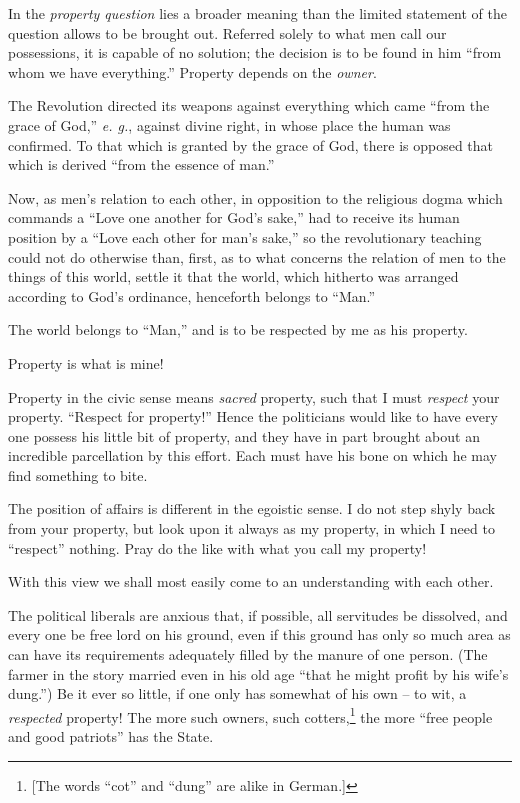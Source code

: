 \documentclass[12pt,a4paper]{book}
\begin{document}
In the \textit{property question} lies a broader meaning than the limited 
statement of the question allows to be brought out. Referred solely to what 
men call our possessions, it is capable of no solution; the decision is to be 
found in him ``from whom we have everything.'' Property depends on the 
\textit{owner}.

The Revolution directed its weapons against everything which came ``from the 
grace of God,'' \textit{e. g.}, against divine right, in whose place the 
human was confirmed. To that which is granted by the grace of God, there is 
opposed that which is derived ``from the essence of man.''

Now, as men's relation to each other, in opposition to the religious dogma 
which commands a ``Love one another for God's sake,'' had to receive its 
human position by a ``Love each other for man's sake,'' so the revolutionary 
teaching could not do otherwise than, first, as to what concerns the relation 
of men to the things of this world, settle it that the world, which hitherto 
was arranged according to God's ordinance, henceforth belongs to ``Man.''

The world belongs to ``Man,'' and is to be respected by me as his property.

Property is what is mine!

Property in the civic sense means \textit{sacred} property, such that I must 
\textit{respect} your property. ``Respect for property!'' Hence the 
politicians would like to have every one possess his little bit of property, 
and they have in part brought about an incredible parcellation by this effort. 
Each must have his bone on which he may find something to bite.

The position of affairs is different in the egoistic sense. I do not step 
shyly back from your property, but look upon it always as my property, in 
which I need to ``respect'' nothing. Pray do the like with what you call my 
property!

With this view we shall most easily come to an understanding with each other.

The political liberals are anxious that, if possible, all servitudes be 
dissolved, and every one be free lord on his ground, even if this ground has 
only so much area as can have its requirements adequately filled by the manure 
of one person. (The farmer in the story married even in his old age ``that he 
might profit by his wife's dung.'') Be it ever so little, if one only has 
somewhat of his own -- to wit, a \textit{respected} property! The more such 
owners, such cotters,\footnote{[The words ``cot'' and ``dung'' are alike 
in German.]} the more ``free people and good patriots'' has the State.
\end{document}
